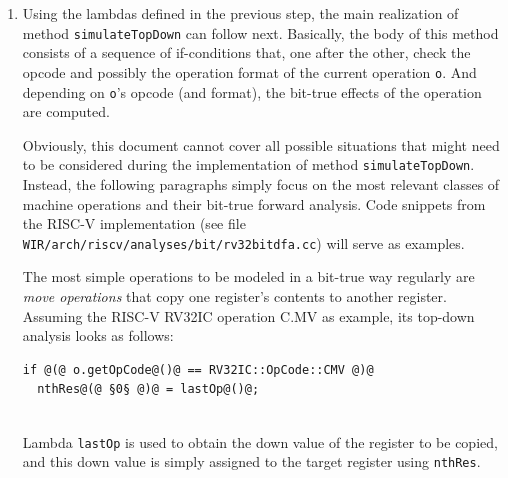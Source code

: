 \begin{enumerate}[resume]
\begin{wirWarn}
    The code of the top-down analysis still to be developed thus has to make sure that these lambdas are used only in appropriate contexts for correct opcodes and operation formats featuring the desired numbers and positions of (register) parameters.
  \end{wirWarn}

  \item Using the lambdas defined in the previous step, the main realization of method \texttt{simulateTopDown} can follow next.
  Basically, the body of this method consists of a sequence of if-conditions that, one after the other, check the opcode and possibly the operation format of the current operation \texttt{o}.
  And depending on \texttt{o}'s opcode (and format), the bit-true effects of the operation are computed.

  Obviously, this document cannot cover all possible situations that might need to be considered during the implementation of method \texttt{simulateTopDown}.
  Instead, the following paragraphs simply focus on the most relevant classes of machine operations and their bit-true forward analysis.
  Code snippets from the RISC-V implementation (see file \texttt{WIR/arch/riscv/analyses/bit/rv32bitdfa.cc}) will serve as examples.

  The most simple operations to be modeled in a bit-true way regularly are \emph{move operations} that copy one register's contents to another register.
  Assuming the RISC-V RV32IC operation C.MV as example, its top-down analysis looks as follows: \\
\begin{lstlisting}[style=code,float=!h,xleftmargin=10mm,aboveskip=-0.8 \baselineskip,belowskip=-0.8 \baselineskip]
if @(@ o.getOpCode@()@ == RV32IC::OpCode::CMV @)@
  nthRes@(@ §0§ @)@ = lastOp@()@;
\end{lstlisting}
  \\
  Lambda \texttt{lastOp} is used to obtain the down value of the register to be copied, and this down value is simply assigned to the target register using \texttt{nthRes}.


\end{enumerate}
